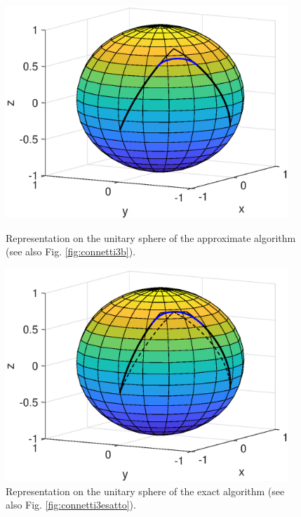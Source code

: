 \begin{figure}[tbp]
    \begin{minipage}[t]{0.49\textwidth}
        \centering
        \includegraphics[width=0.95\textwidth]{figures/sfera1a}
        \caption{Representation on the unitary sphere of the approximate algorithm (see also Fig. \ref{fig:connetti3b}).}
        \label{fig:sfera1}
    \end{minipage}
    \hfill
    \begin{minipage}[t]{0.49\textwidth}
        \centering
        \includegraphics[width=0.95\textwidth]{figures/sfera2a}
        \caption{Representation on the unitary sphere of the exact algorithm (see also Fig. \ref{fig:connetti3esatto}).}
        \label{fig:sfera2}
    \end{minipage}  
\end{figure}

